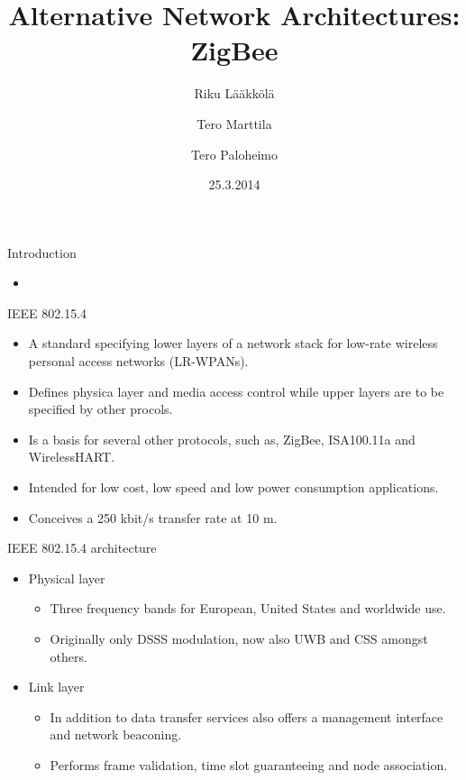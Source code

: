 \documentclass{beamer}
\title[ZigBee]{Alternative Network Architectures: ZigBee}
\author{Riku Lääkkölä \and Tero Marttila \and Tero Paloheimo}
\institute{Aalto ELEC}
\date{25.3.2014}
\begin{document}
\begin{frame}
  	\titlepage
\end{frame}


\begin{frame}{Introduction}
	\begin{itemize}
    \item 
 	\end{itemize}
\end{frame}

\begin{frame}{IEEE 802.15.4}
  \begin{itemize}
    \item A standard specifying lower layers of a network stack for low-rate
    wireless personal access networks (LR-WPANs).
    \item Defines physica layer and media access control while upper layers
    are to be specified by other procols.
    \item Is a basis for several other protocols, such as, ZigBee, ISA100.11a
    and WirelessHART.
    \item Intended for low cost, low speed and low power consumption applications.
    \item Conceives a 250 kbit/s transfer rate at 10 m.
  \end{itemize}
\end{frame}

\begin{frame}{IEEE 802.15.4 architecture}
  \begin{itemize}
    \item Physical layer
    \begin{itemize}
      \item Three frequency bands for European, United States and worldwide use.
      \item Originally only DSSS modulation, now also UWB and CSS amongst others.
    \end{itemize}
  \item Link layer
    \begin{itemize}
      \item In addition to data transfer services also offers a management
      interface and network beaconing.
      \item Performs frame validation, time slot guaranteeing and node association.
    \end{itemize}
  \end{itemize}
\end{frame}
\end{document}
